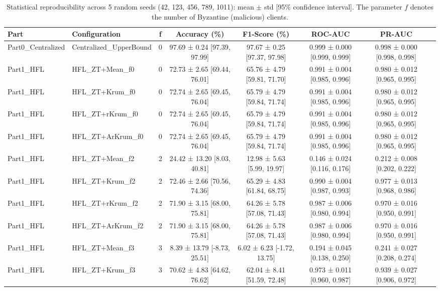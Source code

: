 
\begin{table}[htbp]
\centering
\caption{Statistical reproducibility across 5 random seeds (42, 123, 456, 789, 1011): mean $\pm$ std [95\% confidence interval]. The parameter $f$ denotes the number of Byzantine (malicious) clients.}
\label{tbl:reproducibility}
\small
\begin{tabular}{llcccccc}
\toprule
\textbf{Part} & \textbf{Configuration} & \textbf{f} & \textbf{Accuracy (\%)} & \textbf{F1-Score (\%)} & \textbf{ROC-AUC} & \textbf{PR-AUC} \\
\midrule
Part0\_Centralized & Centralized\_UpperBound & 0 & 97.69 ± 0.24 [97.39, 97.99] & 97.67 ± 0.25 [97.37, 97.98] & 0.999 ± 0.000 [0.999, 0.999] & 0.998 ± 0.000 [0.998, 0.998] \\
Part1\_HFL & HFL\_ZT+Mean\_f0 & 0 & 72.73 ± 2.65 [69.44, 76.01] & 65.76 ± 4.79 [59.81, 71.70] & 0.991 ± 0.004 [0.985, 0.996] & 0.980 ± 0.012 [0.965, 0.995] \\
Part1\_HFL & HFL\_ZT+Krum\_f0 & 0 & 72.74 ± 2.65 [69.45, 76.04] & 65.79 ± 4.79 [59.84, 71.74] & 0.991 ± 0.004 [0.985, 0.996] & 0.980 ± 0.012 [0.965, 0.995] \\
Part1\_HFL & HFL\_ZT+rKrum\_f0 & 0 & 72.74 ± 2.65 [69.45, 76.04] & 65.79 ± 4.79 [59.84, 71.74] & 0.991 ± 0.004 [0.985, 0.996] & 0.980 ± 0.012 [0.965, 0.995] \\
Part1\_HFL & HFL\_ZT+ArKrum\_f0 & 0 & 72.74 ± 2.65 [69.45, 76.04] & 65.79 ± 4.79 [59.84, 71.74] & 0.991 ± 0.004 [0.985, 0.996] & 0.980 ± 0.012 [0.965, 0.995] \\
Part1\_HFL & HFL\_ZT+Mean\_f2 & 2 & 24.42 ± 13.20 [8.03, 40.81] & 12.98 ± 5.63 [5.99, 19.97] & 0.146 ± 0.024 [0.116, 0.176] & 0.212 ± 0.008 [0.202, 0.222] \\
Part1\_HFL & HFL\_ZT+Krum\_f2 & 2 & 72.46 ± 2.66 [70.56, 74.36] & 65.29 ± 4.83 [61.84, 68.75] & 0.990 ± 0.004 [0.987, 0.993] & 0.977 ± 0.013 [0.968, 0.986] \\
Part1\_HFL & HFL\_ZT+rKrum\_f2 & 2 & 71.90 ± 3.15 [68.00, 75.81] & 64.26 ± 5.78 [57.08, 71.43] & 0.987 ± 0.006 [0.980, 0.994] & 0.970 ± 0.016 [0.950, 0.991] \\
Part1\_HFL & HFL\_ZT+ArKrum\_f2 & 2 & 71.90 ± 3.15 [68.00, 75.81] & 64.26 ± 5.78 [57.08, 71.43] & 0.987 ± 0.006 [0.980, 0.994] & 0.970 ± 0.016 [0.950, 0.991] \\
Part1\_HFL & HFL\_ZT+Mean\_f3 & 3 & 8.39 ± 13.79 [-8.73, 25.51] & 6.02 ± 6.23 [-1.72, 13.75] & 0.194 ± 0.045 [0.138, 0.250] & 0.241 ± 0.027 [0.208, 0.274] \\
Part1\_HFL & HFL\_ZT+Krum\_f3 & 3 & 70.62 ± 4.83 [64.62, 76.62] & 62.04 ± 8.41 [51.59, 72.48] & 0.973 ± 0.011 [0.960, 0.987] & 0.939 ± 0.027 [0.906, 0.972] \\

\end{tabular}
\end{table}
